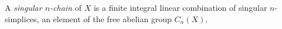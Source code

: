 
A \emph{singular $n$-chain} of $X$ is a finite integral linear combination of singular $n$-simplices, an element of the free abelian group $C_n(X)$.
